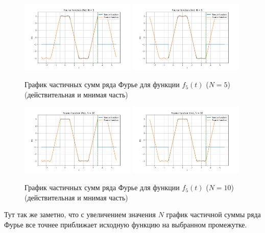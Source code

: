 \begin{figure}[ht!]
    \centering
    \includegraphics[width=0.49\textwidth]{media/plots/func_5_real_N_5.png}
    \includegraphics[width=0.49\textwidth]{media/plots/func_5_imag_N_5.png}
    \caption{График частичных сумм ряда Фурье для функции $f_5(t)$ ($N = 5$) (действительная и мнимая часть)}
    \label{fig:func_5_fourier_re_im_N_5}
\end{figure}

\begin{figure}[ht!]
    \centering
    \includegraphics[width=0.49\textwidth]{media/plots/func_5_real_N_10.png}
    \includegraphics[width=0.49\textwidth]{media/plots/func_5_imag_N_10.png}
    \caption{График частичных сумм ряда Фурье для функции $f_5(t)$ ($N = 10$) (действительная и мнимая часть)}
    \label{fig:func_5_fourier_re_im_N_10}
\end{figure}

Тут так же заметно, что с увеличением значения $N$ график частичной суммы ряда Фурье все точнее приближает исходную функцию на выбранном промежутке. 

